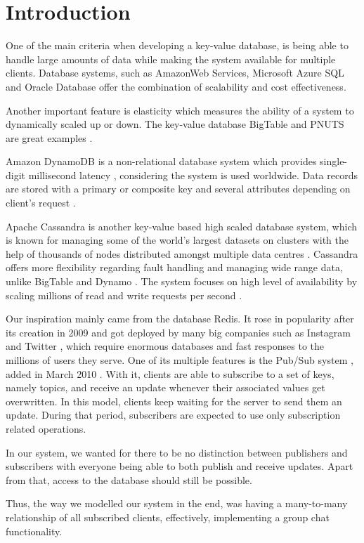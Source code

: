 \section{Introduction}
\label{sec:introduction}
One of the main criteria when developing a key-value database, is being able to handle large amounts of data while making the system available for multiple clients. Database systems, such as AmazonWeb Services, Microsoft Azure SQL and Oracle Database offer the combination of scalability and cost effectiveness.

Another important feature is elasticity which measures the ability of a system to dynamically scaled up or down. The key-value database BigTable and PNUTS are great examples \cite{agrawal2011database}.

Amazon DynamoDB is a non-relational database system which provides single-digit millisecond latency \cite{amazon}, considering the system is used worldwide. Data records are stored with a primary or composite key and several attributes depending on client's request \cite{kalid2017big}. 

Apache Cassandra is another key-value based high scaled \cite{abadi2012consistency} database system, which is known for managing some of the world's largest datasets on clusters with the help of thousands of nodes distributed amongst multiple data centres \cite{chebotko2015big}. Cassandra offers more flexibility regarding fault handling and managing wide range data, unlike BigTable and Dynamo \cite{kalid2017big}. The system focuses on high level of availability by scaling millions of read and write requests per second \cite{chebotko2015big}.

Our inspiration mainly came from the database Redis. It rose in popularity after its creation in 2009 and got deployed by many big companies such as Instagram \cite{krieger2011instagram} and Twitter \cite{yu2014twitter}, which require enormous databases and fast responses to the millions of users they serve. One of its multiple features is the Pub/Sub system \cite{redis2020pubsub}, added in March 2010 \cite{sanfilippo2010pubsub}. With it, clients are able to subscribe to a set of keys, namely topics, and receive an update whenever their associated values get overwritten. In this model, clients keep waiting for the server to send them an update. During that period, subscribers are expected to use only subscription related operations.

In our system, we wanted for there to be no distinction between publishers and subscribers with everyone being able to both publish and receive updates. Apart from that, access to the database should still be possible. 

Thus, the way we modelled our system in the end, was having a many-to-many relationship of all subscribed clients, effectively, implementing a group chat functionality.


